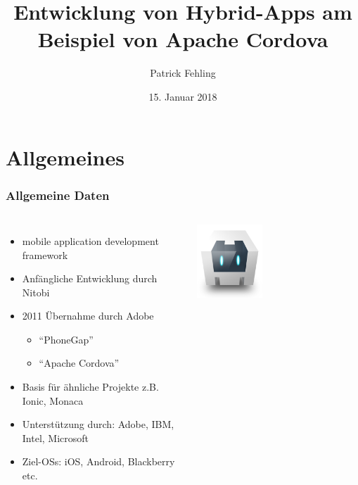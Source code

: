 \documentclass[xcolor=dvipsnames]{beamer}
\title[Entwicklung von Hybrid-Apps am Beispiel von Apache Cordova]{Entwicklung von Hybrid-Apps am Beispiel von Apache Cordova}
\author{Patrick Fehling}
\institute{Hochschule für Technik und Wirtschaft Berlin}
\date{15. Januar 2018}
\begin{document}
\maketitle
\frame{\tableofcontents}


\section{Allgemeines}

\begin{frame}\frametitle{Allgemeine Daten}
	\begin{columns}[t,onlytextwidth]
		\begin{itemize}
			\item mobile application development framework
			\item Anfängliche Entwicklung durch Nitobi
			\item 2011 Übernahme durch Adobe
			\begin{itemize}
				\item "`PhoneGap"'
				\item "`Apache Cordova"'
			\end{itemize}
			\item Basis für ähnliche Projekte z.B. Ionic, Monaca
			\item Unterstützung durch: Adobe, IBM, Intel, Microsoft
			\item Ziel-OSs: iOS, Android, Blackberry etc.
		\end{itemize}
		\centering
		
		\includegraphics[width=0.4\textwidth]{pictures/cordova_logo}
		

\end{columns}
\end{frame}
\end{document}
